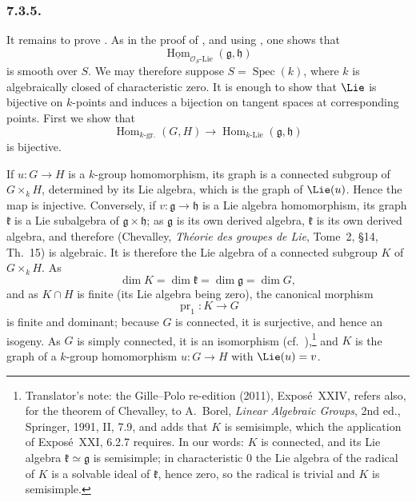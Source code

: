 \subsubsection*{7.3.5.}

It remains to prove . As in the proof of , and using ,
one shows that
\[
  \underline{\operatorname{Hom}}_{\mathcal O_S\text{-}\mathrm{Lie}}
    (\mathfrak g,\mathfrak h)
\]
is smooth over \(S\). We may therefore suppose
\(S=\operatorname{Spec}(k)\), where \(k\) is algebraically closed of
characteristic zero. It is enough to show that \(\Lie\) is bijective
on \(k\)-points and induces a bijection on tangent spaces at
corresponding points. First we show that
\[
  \operatorname{Hom}_{k\text{-}\mathrm{gr.}}(G,H)
  \longrightarrow
  \operatorname{Hom}_{k\text{-}\mathrm{Lie}}
    (\mathfrak g,\mathfrak h)
\]
is bijective.

If \(u:G\to H\) is a \(k\)-group homomorphism, its graph is a connected
subgroup of \(G\times_k H\), determined by its Lie algebra, which is
the graph of \(\Lie(u)\). Hence the map is injective. Conversely, if
\(v:\mathfrak g\to\mathfrak h\) is a Lie algebra homomorphism, its
graph \(\mathfrak k\) is a Lie subalgebra of
\(\mathfrak g\times\mathfrak h\); as \(\mathfrak g\) is its own derived algebra,
\(\mathfrak k\) is its own derived algebra, and therefore (Chevalley, \emph{Théorie des groupes de
Lie}, Tome~2, \S14, Th.~15) is algebraic. It is therefore the Lie algebra of a connected subgroup
\(K\) of \(G\times_k H\). As
\[
  \dim K=\dim\mathfrak k=\dim\mathfrak g=\dim G,
\]
and as \(K\cap H\) is finite (its Lie algebra being zero), the
canonical morphism
\[
  \operatorname{pr}_1:K\longrightarrow G
\]
is finite and dominant; because \(G\) is connected, it is surjective,
and hence an isogeny. As \(G\) is simply connected, it is an isomorphism
(cf.\ ),\footnote{Translator's note: the Gille--Polo re-edition (2011), Exposé~XXIV, refers also, for
the theorem of Chevalley, to A.~Borel, \emph{Linear Algebraic Groups}, 2nd ed., Springer, 1991, II,
7.9, and adds that \(K\) is semisimple, which the application of Exposé~XXI, 6.2.7 requires. In our
words: \(K\) is connected, and its Lie algebra \(\mathfrak k\simeq\mathfrak g\) is semisimple; in
characteristic \(0\) the Lie algebra of the radical of \(K\) is a solvable ideal of \(\mathfrak k\),
hence zero, so the radical is trivial and \(K\) is semisimple.} and \(K\) is the graph of a \(k\)-group
homomorphism \(u:G\to H\) with \(\Lie(u)=v\).

